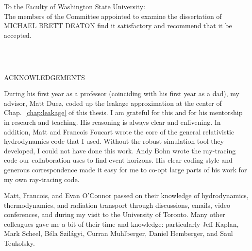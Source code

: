 \documentclass[12pt]{report}
\begin{document}
\begin{singlespace}
  \noindent
  \vspace{1.5in}

  \noindent To the Faculty of Washington State University:\\
  
  The members of the Committee appointed to examine the dissertation of
  \uppercase{Michael Brett Deaton}
  find it satisfactory and recommend that it be accepted.
  
  \begin{flushright}
    \\
    \\
  \end{flushright}
\end{singlespace}
\newpage

\begin{center}
  \uppercase{Acknowledgements}
\end{center}

  \bigskip
  During his first year as a professor (coinciding with his first
  year as a dad), my advisor, Matt Duez, coded up the leakage approximation
  at the center of Chap.~\ref{chap:leakage} of this thesis. I am grateful
  for this and for his mentorship in research and teaching. His reasoning is
  always clear and enlivening.
  In addition, Matt and Francois Foucart wrote the core of the general
  relativistic hydrodynamics code that I used. Without the robust simulation
  tool they developed, I could not have done this work.
  Andy Bohn wrote the ray-tracing code our collaboration uses to find event
  horizons. His clear coding style and generous correspondence made it easy
  for me to co-opt large parts of his work for my own ray-tracing code.

  Matt, Francois, and Evan O'Connor passed
  on their knowledge of hydrodynamics, thermodynamics, and radiation transport
  through discussions, emails, video conferences, and during my visit to the
  University of Toronto.
  Many other colleagues gave me a bit of their time and knowledge: particularly
  Jeff Kaplan, Mark Scheel, B\'ela Szil\'agyi, Curran Muhlberger,
  Daniel Hemberger, and Saul Teukolsky.
\end{document}
